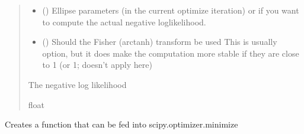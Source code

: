 \documentclass[letterpaper,10pt,english]{sphinxmanual}
\begin{document}
\begin{fulllineitems}
\begin{fulllineitems}
\begin{quote}
\begin{description}
\begin{itemize}
\item {}
\sphinxAtStartPar
{} (\sphinxstyleliteralemphasis{\sphinxupquote{{[}}}\sphinxstyleliteralemphasis{\sphinxupquote{{]}}}) \textendash{} Ellipse parameters (in the current optimize iteration) or if you
want to compute the actual negative log\sphinxhyphen{}likelihood.

\item {}
\sphinxAtStartPar
{} () \textendash{} Should the Fisher (arctanh) transform be used
This is usually option, but it does make the computation
more stable if they are close to 1 (or \sphinxhyphen{}1; doesn’t apply here)

\end{itemize}

\sphinxAtStartPar
{} \textendash{} The negative log likelihood

\sphinxAtStartPar
float

\end{description}\end{quote}

\end{fulllineitems}


\begin{fulllineitems}
\label{\detokenize{ellipse:glomar_gridding.ellipse.EllipseModel.negative_log_likelihood_function}}
\pysigstartsignatures
\pysiglinewithargsret
{}
{\sphinxparamcomma {}}
{}
\pysigstopsignatures
\sphinxAtStartPar
Creates a function that can be fed into scipy.optimizer.minimize
\begin{quote}\begin{description}
\sphinxAtStartPar
{}

\end{description}\end{quote}

\end{fulllineitems}


\end{fulllineitems}
\end{document}
